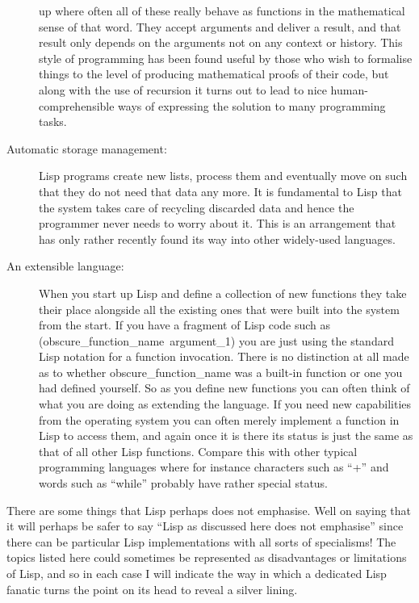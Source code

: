 \begin{description}
up where often all of these really behave as functions in the mathematical
sense of that word. They accept arguments and deliver a result, and that
result only depends on the arguments not on any context or history.
This style of programming has been found useful by those who wish to
formalise things to the level of producing mathematical proofs of their
code, but along with the use of recursion it turns out to lead to
nice human-comprehensible ways of expressing the solution to many
programming tasks.
\item[Automatic storage management:] Lisp programs create new lists,
process them and eventually move on such that they do not need that data
any more. It is fundamental to Lisp that the system takes care of recycling
discarded data and hence the programmer never needs to worry about it. This
is an arrangement that has only rather recently found its way into
other widely-used languages.
\item[An extensible language:] When you start up Lisp and define a collection
of new functions they take their place alongside all the existing ones that
were built into the system from the start. If you have a fragment of Lisp
code such as {\tx(obscure\_function\_name~argument\_1)} you are just using
the standard Lisp notation for a function invocation. There is no distinction
at all made as to whether {\tx obscure\_function\_name} was a built-in function
or one you had defined yourself. So as you define new functions you can often
think of what you are doing as extending the language. If you need new
capabilities from the operating system you can often merely implement
a function in Lisp to access them, and again once it is there its status is
just the same as that of all other Lisp functions. Compare this with other
typical programming languages where for instance characters such
as ``{\tx +}'' and words such as ``{\tx while}'' probably have rather
special status.
\end{description}

There are some things that Lisp perhaps does not emphasise. Well on saying
that it will perhaps be safer to say ``Lisp as discussed here does not
emphasise'' since there can be particular Lisp implementations with all sorts
of specialisms! The topics listed here could sometimes be represented
as disadvantages or limitations of Lisp, and so in each case I will
indicate the way in which a dedicated Lisp fanatic turns the point on its head
to reveal a silver lining.

